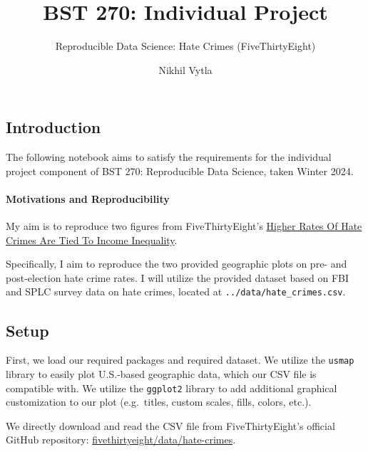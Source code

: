 \documentclass[
  letterpaper,
  DIV=11,
  numbers=noendperiod]{scrartcl}
\title{BST 270: Individual Project}
\subtitle{Reproducible Data Science: Hate Crimes (FiveThirtyEight)}
\author{Nikhil Vytla}
\date{}
\let\oldparagraph\paragraph
\renewcommand{\paragraph}[1]{\oldparagraph{#1}\mbox{}}
\begin{document}
\maketitle
\ifdefined\Shaded\renewenvironment{Shaded}{\begin{tcolorbox}[boxrule=0pt, enhanced, borderline west={3pt}{0pt}{shadecolor}, sharp corners, breakable, frame hidden, interior hidden]}{\end{tcolorbox}}\fi

\hypertarget{introduction}{%
\subsection{Introduction}\label{introduction}}

The following notebook aims to satisfy the requirements for the
individual project component of BST 270: Reproducible Data Science,
taken Winter 2024.

\hypertarget{motivations-and-reproducibility}{%
\paragraph{Motivations and
Reproducibility}\label{motivations-and-reproducibility}}

My aim is to reproduce two figures from FiveThirtyEight's
\href{https://fivethirtyeight.com/features/higher-rates-of-hate-crimes-are-tied-to-income-inequality/}{Higher
Rates Of Hate Crimes Are Tied To Income Inequality}.

Specifically, I aim to reproduce the two provided geographic plots on
pre- and post-election hate crime rates. I will utilize the provided
dataset based on FBI and SPLC survey data on hate crimes, located at
\texttt{../data/hate\_crimes.csv}.

\hypertarget{setup}{%
\subsection{Setup}\label{setup}}

First, we load our required packages and required dataset. We utilize
the \texttt{usmap} library to easily plot U.S.-based geographic data,
which our CSV file is compatible with. We utilize the \texttt{ggplot2}
library to add additional graphical customization to our plot
(e.g.~titles, custom scales, fills, colors, etc.).

We directly download and read the CSV file from FiveThirtyEight's
official GitHub repository:
\href{https://github.com/fivethirtyeight/data/tree/master/hate-crimes}{fivethirtyeight/data/hate-crimes}.
\end{document}
